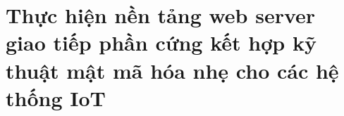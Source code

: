 \chapter{Thực hiện nền tảng web server giao tiếp phần cứng kết hợp kỹ thuật mật mã hóa nhẹ cho các hệ thống IoT}
\label{Chapter3}
